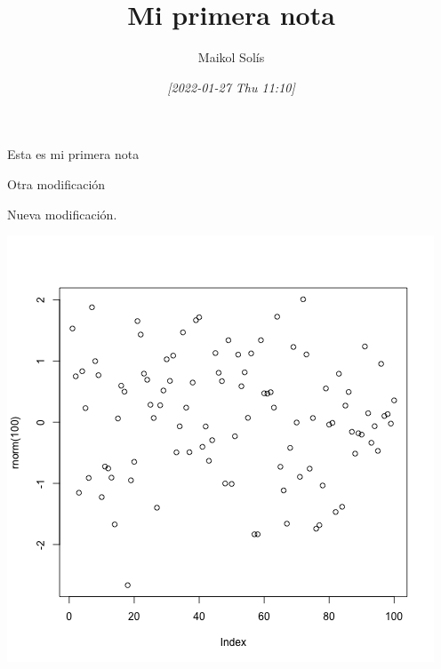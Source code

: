 \documentclass[11pt]{article}
\author{Maikol Solís}
\date{\textit{[2022-01-27 Thu 11:10]}}
\title{Mi primera nota}
\begin{document}
\maketitle
\tableofcontents

Esta es mi primera nota

Otra modificación

Nueva modificación.


\begin{center}
\includegraphics[width=.9\linewidth]{20220127T111026-figure-1-grafico_de_normales.png}
\end{center}
\end{document}
